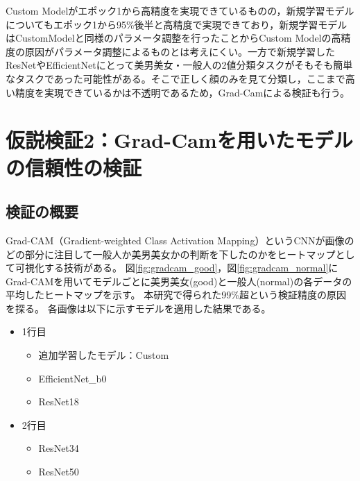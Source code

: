 \documentclass[a4paper,11pt,titlepage]{jsarticle}
\begin{document}

Custom Modelがエポック1から高精度を実現できているものの，新規学習モデルについてもエポック1から95\%後半と高精度で実現できており，新規学習モデルはCustomModelと同様のパラメータ調整を行ったことからCustom Modelの高精度の原因がパラメータ調整によるものとは考えにくい。一方で新規学習したResNetやEfficientNetにとって美男美女・一般人の2値分類タスクがそもそも簡単なタスクであった可能性がある。そこで正しく顔のみを見て分類し，ここまで高い精度を実現できているかは不透明であるため，Grad-Camによる検証も行う。




\section{仮説検証2：Grad-Camを用いたモデルの信頼性の検証}
\label{label:仮説検証2}
\subsection{検証の概要}
Grad-CAM（Gradient-weighted Class Activation Mapping）というCNNが画像のどの部分に注目して一般人か美男美女かの判断を下したのかをヒートマップとして可視化する技術がある。
図\ref{fig:gradcam_good}，図\ref{fig:gradcam_normal}にGrad-CAMを用いてモデルごとに美男美女(good)と一般人(normal)の各データの平均したヒートマップを示す。
本研究で得られた99\%超という検証精度の原因を探る。
各画像は以下に示すモデルを適用した結果である。
\begin{itemize}
	\item 1行目
	\begin{itemize}
	\item 追加学習したモデル：Custom
	\item EfficientNet\_b0
	\item ResNet18
	\end{itemize}
	\item 2行目
	\begin{itemize}
	\item ResNet34
	\item ResNet50
	\end{itemize}
\end{itemize}
\end{document}
